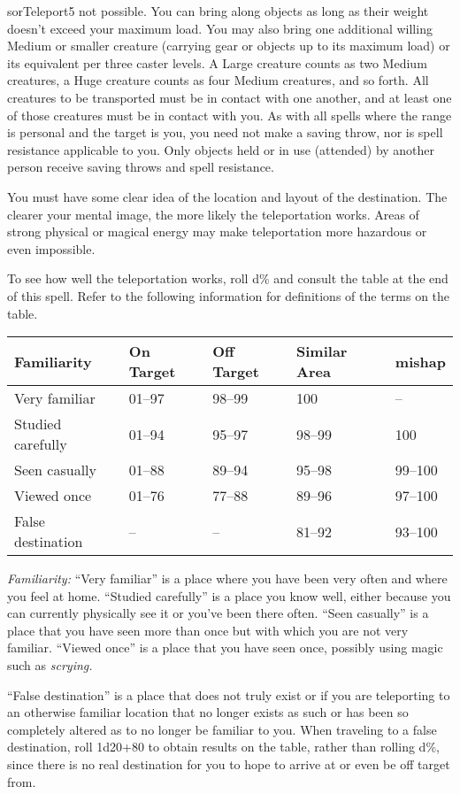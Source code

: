 \begin{spellcard}{sor}{Teleport}{5}
  not possible. You can bring along objects as long as their weight
  doesn't exceed your maximum load. You may also bring one additional
  willing Medium or smaller creature (carrying gear or objects up to its
  maximum load) or its equivalent per three caster levels. A Large
  creature counts as two Medium creatures, a Huge creature counts as four
  Medium creatures, and so forth. All creatures to be transported must be
  in contact with one another, and at least one of those creatures must be
  in contact with you. As with all spells where the range is personal and
  the target is you, you need not make a saving throw, nor is spell
  resistance applicable to you. Only objects held or in use (attended) by
  another person receive saving throws and spell resistance.

  You must have some clear idea of the location and layout of the
  destination. The clearer your mental image, the more likely the
  teleportation works. Areas of strong physical or magical energy may make
  teleportation more hazardous or even impossible.

  To see how well the teleportation works, roll d\% and consult the table
  at the end of this spell. Refer to the following information for
  definitions of the terms on the table.

  \begin{longtable}[]{@{}lllll@{}}
    \toprule
    Familiarity       & On Target & Off Target & Similar Area & mishap \tabularnewline\midrule
    \endhead{}
    Very familiar     & 01--97    & 98--99     & 100          & --\tabularnewline{}
    Studied carefully & 01--94    & 95--97     & 98--99       & 100\tabularnewline{}
    Seen casually     & 01--88    & 89--94     & 95--98       & 99--100\tabularnewline{}
    Viewed once       & 01--76    & 77--88     & 89--96       & 97--100\tabularnewline{}
    False destination & --        & --         & 81--92       & 93--100\tabularnewline\bottomrule
  \end{longtable}

  \emph{Familiarity:} ``Very familiar'' is a place where you have been very
  often and where you feel at home. ``Studied carefully'' is a place you
  know well, either because you can currently physically see it or you've
  been there often. ``Seen casually'' is a place that you have seen more
  than once but with which you are not very familiar. ``Viewed once'' is a
  place that you have seen once, possibly using magic such as
  \emph{scrying.}

  ``False destination'' is a place that does not truly exist or if you are
  teleporting to an otherwise familiar location that no longer exists as
  such or has been so completely altered as to no longer be familiar to
  you. When traveling to a false destination, roll 1d20+80 to obtain
  results on the table, rather than rolling d\%, since there is no real
  destination for you to hope to arrive at or even be off target from.


\end{spellcard}
